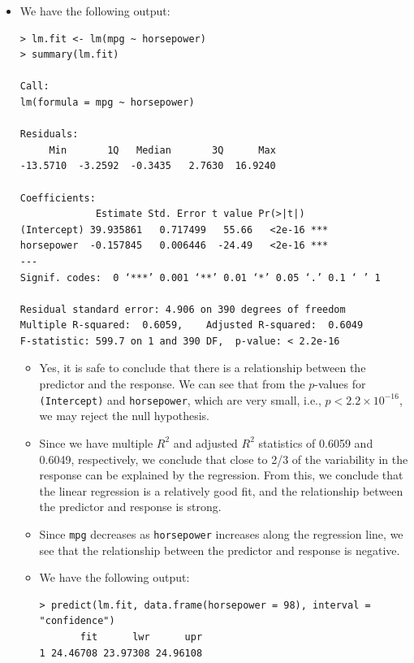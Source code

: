 \begin{itemize}
    \item[(a)] We have the following output:
        \begin{lstlisting}
> lm.fit <- lm(mpg ~ horsepower)
> summary(lm.fit)

Call:
lm(formula = mpg ~ horsepower)

Residuals:
     Min       1Q   Median       3Q      Max
-13.5710  -3.2592  -0.3435   2.7630  16.9240

Coefficients:
             Estimate Std. Error t value Pr(>|t|)
(Intercept) 39.935861   0.717499   55.66   <2e-16 ***
horsepower  -0.157845   0.006446  -24.49   <2e-16 ***
---
Signif. codes:  0 ‘***’ 0.001 ‘**’ 0.01 ‘*’ 0.05 ‘.’ 0.1 ‘ ’ 1

Residual standard error: 4.906 on 390 degrees of freedom
Multiple R-squared:  0.6059,    Adjusted R-squared:  0.6049
F-statistic: 599.7 on 1 and 390 DF,  p-value: < 2.2e-16
        \end{lstlisting}
        \begin{itemize}
            \item[i.] Yes, it is safe to conclude that there is a relationship
                between the predictor and the response. We can see that from
                the $p$-values for \verb|(Intercept)| and \verb|horsepower|,
                which are very small, i.e., $p < 2.2 \times {10}^{-16}$, we may
                reject the null hypothesis.
            \item[ii.] Since we have multiple $R^2$ and adjusted $R^2$ statistics
                of 0.6059 and 0.6049, respectively, we conclude that close to 2/3
                of the variability in the response can be explained by the regression.
                From this, we conclude that the linear regression is a relatively
                good fit, and the relationship between the predictor and response
                is strong.
            \item[iii.] Since \verb|mpg| decreases as \verb|horsepower| increases
                along the regression line, we see that the relationship between
                the predictor and response is negative.
            \item[iv.] We have the following output:
                \begin{lstlisting}
> predict(lm.fit, data.frame(horsepower = 98), interval = "confidence")
       fit      lwr      upr
1 24.46708 23.97308 24.96108
                \end{lstlisting}

\end{itemize}
\end{itemize}
